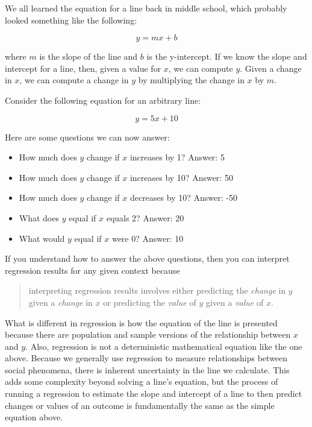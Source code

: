\documentclass[
]{book}
\providecommand{\tightlist}{%
  \setlength{\itemsep}{0pt}\setlength{\parskip}{0pt}}
\begin{document}
We all learned the equation for a line back in middle school, which probably looked something like the following:

\begin{equation}
y = mx + b
\label{eq:line}
\end{equation}

where \(m\) is the slope of the line and \(b\) is the y-intercept. If we know the slope and intercept for a line, then, given a value for \(x\), we can compute \(y\). Given a change in \(x\), we can compute a change in \(y\) by multiplying the change in \(x\) by \(m\).

Consider the following equation for an arbitrary line:

\[y = 5x + 10\]

Here are some questions we can now answer:

\begin{itemize}
\tightlist
\item
  How much does \(y\) change if \(x\) increases by 1? Answer: 5
\item
  How much does \(y\) change if \(x\) increases by 10? Answer: 50
\item
  How much does \(y\) change if \(x\) decreases by 10? Answer: -50
\item
  What does \(y\) equal if \(x\) equals 2? Answer: 20
\item
  What would \(y\) equal if \(x\) were 0? Answer: 10
\end{itemize}

If you understand how to answer the above questions, then you can interpret regression results for any given context because

\begin{quote}
interpreting regression results involves either predicting the \emph{change} in \(y\) given a \emph{change} in \(x\) or predicting the \emph{value} of \(y\) given a \emph{value} of \(x\).
\end{quote}

What is different in regression is how the equation of the line is presented because there are population and sample versions of the relationship between \(x\) and \(y\). Also, regression is not a deterministic mathematical equation like the one above. Because we generally use regression to measure relationships between social phenomena, there is inherent uncertainty in the line we calculate. This adds some complexity beyond solving a line's equation, but the process of running a regression to estimate the slope and intercept of a line to then predict changes or values of an outcome is fundamentally the same as the simple equation above.
\end{document}
